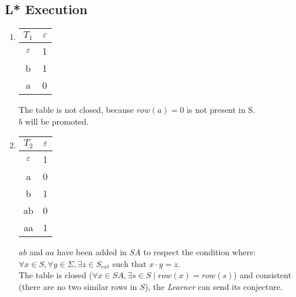\subsection{L* Execution}
\label{sec:l-exec}
\begin{enumerate}
  \item \begin{minipage}{0.3\textwidth}
          \begin{tabular}{c||c}
            $T_1$ & $\varepsilon$ \\
            \hline\hline
            $\varepsilon$  & 1    \\
            \hline\hline
            b     & 1    \\
            a     & 0    \\
          \end{tabular}
        \end{minipage} \quad
        \begin{minipage}{0.6\textwidth}
          The table is not closed, because $row(a) = 0$ is not present in S. \\
          $b$ will be promoted.
        \end{minipage}
  \item \begin{minipage}{0.3\textwidth}
          \begin{tabular}{c||c}
            $T_2$ & $\varepsilon$ \\
            \hline\hline
            $\varepsilon$  & 1    \\
            a     & 0    \\
            \hline\hline
            b     & 1    \\
            ab    & 0    \\
            aa    & 1    \\
          \end{tabular}
        \end{minipage}\quad
        \begin{minipage}{0.6\textwidth}
          $ab$ and $aa$ have been added in $SA$ to respect the condition where: $\forall x \in S, \forall y \in \Sigma, \exists z \in S_{ext} \text{ such that } x \cdot y = z $.\\
          The table is closed ($\forall x \in SA, \exists s \in S \mid row(x) = row(s)$) and consistent (there are no two similar rows in $S$), the \textit{Learner} can send its conjecture.
        \end{minipage}


\end{enumerate}
